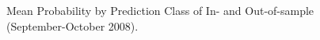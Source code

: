 \begin{figure}[H]
    \centering
    \caption{Mean Probability by Prediction Class of In- and Out-of-sample (September-October 2008).}
    \label{fig:figure-7}
\end{figure}
